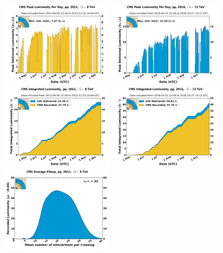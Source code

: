 \begin{figure}[!htb]
  \includegraphics[width=0.49\textwidth]{figures/peak_lumi_per_day_pp_2012}
  \includegraphics[width=0.49\textwidth]{figures/peak_lumi_per_day_pp_2016}
  \includegraphics[width=0.49\textwidth]{figures/int_lumi_per_day_cumulative_pp_2012}
  \includegraphics[width=0.49\textwidth]{figures/int_lumi_per_day_cumulative_pp_2016}
  \includegraphics[width=0.49\textwidth]{figures/pileup_pp_2012}

\end{figure}
